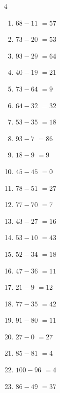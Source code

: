 \begin{multicols}{4}
\begin{enumerate}
  \item $68-11$
        $=57$

  \item $73-20$
        $=53$

  \item $93-29$
        $=64$

  \item $40-19$
        $=21$

  \item $73-64$
        $=9$

  \item $64-32$
        $=32$

  \item $53-35$
        $=18$

  \item $93-7$
        $=86$

  \item $18-9$
        $=9$

\columnbreak %

\resetques

  \item $45-45$
        $=0$

  \item $78-51$
        $=27$

  \item $77-70$
        $=7$

  \item $43-27$
        $=16$

  \item $53-10$
        $=43$

  \item $52-34$
        $=18$

  \item $47-36$
        $=11$

  \item $21-9$
        $=12$

  \item $77-35$
        $=42$

  \item $91-80$
        $=11$

  \item $27-0$
        $=27$

  \item $85-81$
        $=4$

  \item $100-96$
        $=4$

  \item $86-49$
        $=37$


\end{enumerate}
\end{multicols}
